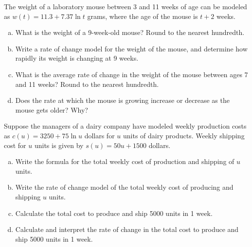 \documentclass[notes]{subfiles}
\begin{document}
		\begin{ex}
			The weight of a laboratory mouse between 3 and 11 weeks of age can be modeled as $w(t) = 11.3 + 7.37\ln t$ grams, where the age of the mouse is $t+2$ weeks.  
			\begin{enumerate}[(a)]
				\item What is the weight of a 9-week-old mouse?  Round to the nearest hundredth. 
					
				\item Write a rate of change model for the weight of the mouse, and determine how rapidly its weight is changing at 9 weeks. 	
					\newpage
					
				\item What is the average rate of change in the weight of the mouse between ages 7 and 11 weeks?  Round to the nearest hundredth. 
					
				\item Does the rate at which the mouse is growing increase or decrease as the mouse gets older?  Why? 
			\end{enumerate}
		\end{ex}
		
		\begin{ex}
			Suppose the managers of a dairy company have modeled weekly production costs as $c(u) = 3250 + 75\ln u$ dollars for $u$ units of dairy products.  Weekly shipping cost for $u$ units is given by $s(u) = 50 u + 1500$ dollars.  
			\begin{enumerate}[(a)]
				\item Write the formula for the total weekly cost of production and shipping of $u$ units. 
					\vs{.75}
				\item Write the rate of change model of the total weekly cost of producing and shipping $u$ units. 
					\vs{1}
				\item Calculate the total cost to produce and ship 5000 units in 1 week. 
					\vs{.75}
				\item Calculate and interpret the rate of change in the total cost to produce and ship 5000 units in 1 week. 
					\vs{1}
			\end{enumerate}
		\end{ex}
			\newpage
			
\end{document}
